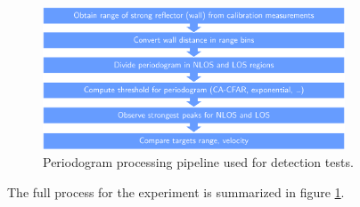 			\begin{figure}[H]
				\centering
				\includegraphics[width=0.8\textwidth]{Images/Test1/NLOS-proc-pipeline_wide_text12.png}
				\caption{\small Periodogram processing pipeline used for detection tests.}
				\label{fig:Test1_NLOS-proc-pipeline}
			\end{figure}
			
			
			The full process for the experiment is summarized in figure \ref{fig:Test1_NLOS-proc-pipeline}.
			
			
		







